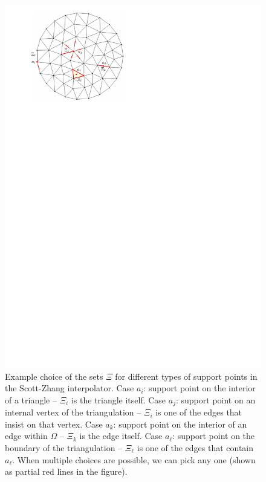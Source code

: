 \begin{figure}[!ht]
    \centering
    \includegraphics{figures/scott_zhang.pdf}
    \caption{Example choice of the sets $\Xi$ for different types of support points in the Scott-Zhang interpolator. Case $a_i$: support point on the interior of a triangle -- $\Xi_i$ is the triangle itself. Case $a_j$: support point on an internal vertex of the triangulation -- $\Xi_i$ is one of the edges that insist on that vertex. Case $a_k$: support point on the interior of an edge within $\Omega$ -- $\Xi_k$ is the edge itself. Case $a_\ell$: support point on the boundary of the triangulation -- $\Xi_\ell$ is one of the edges that contain $a_\ell$. When multiple choices are possible, we can pick any one (shown as partial red lines in the figure).}
    \label{fig:scott_zhang}
\end{figure}

